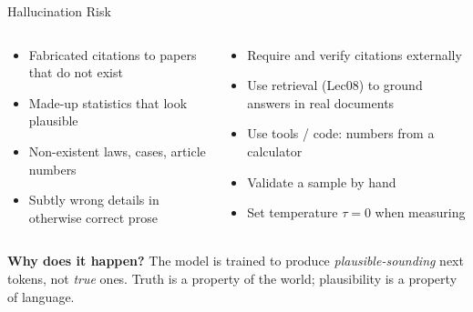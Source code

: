 \begin{frame}{Hallucination Risk}
\begin{columns}[T]
\begin{tcolorbox}[colback=red!5, colframe=red!50!black, title=\textbf{What it looks like}]
\small
\begin{itemize}
\item Fabricated citations to papers that do not exist
\item Made-up statistics that look plausible
\item Non-existent laws, cases, article numbers
\item Subtly wrong details in otherwise correct prose
\end{itemize}
\end{tcolorbox}

\begin{tcolorbox}[colback=green!5, colframe=green!40!black, title=\textbf{Mitigations}]
\small
\begin{itemize}
\item Require and verify citations externally
\item Use retrieval (Lec08) to ground answers in real documents
\item Use tools / code: numbers from a calculator
\item Validate a sample by hand
\item Set temperature $\tau = 0$ when measuring
\end{itemize}
\end{tcolorbox}
\end{columns}

\medskip
\small\textbf{Why does it happen?} The model is trained to produce \emph{plausible-sounding} next tokens, not \emph{true} ones. Truth is a property of the world; plausibility is a property of language.
\end{frame}

